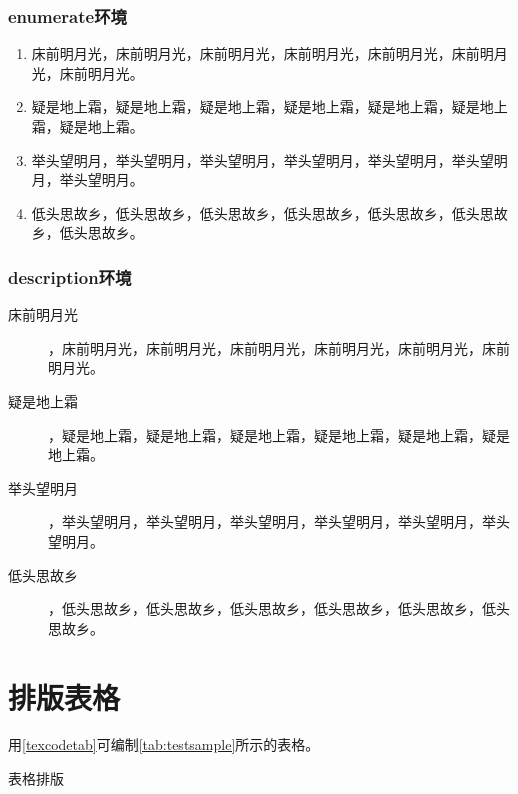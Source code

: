 \documentclass{nwafucoursepaper}
\begin{document}
\subsubsection{enumerate环境}
\begin{enumerate}
\item 床前明月光，床前明月光，床前明月光，床前明月光，床前明月光，床前明月光，床前明月光。
\item 疑是地上霜，疑是地上霜，疑是地上霜，疑是地上霜，疑是地上霜，疑是地上霜，疑是地上霜。
\item 举头望明月，举头望明月，举头望明月，举头望明月，举头望明月，举头望明月，举头望明月。
\item 低头思故乡，低头思故乡，低头思故乡，低头思故乡，低头思故乡，低头思故乡，低头思故乡。
\end{enumerate}
\subsubsection{description环境}
\begin{description}
\item[床前明月光]，床前明月光，床前明月光，床前明月光，床前明月光，床前明月光，床前明月光。
\item[疑是地上霜]，疑是地上霜，疑是地上霜，疑是地上霜，疑是地上霜，疑是地上霜，疑是地上霜。
\item[举头望明月]，举头望明月，举头望明月，举头望明月，举头望明月，举头望明月，举头望明月。
\item[低头思故乡]，低头思故乡，低头思故乡，低头思故乡，低头思故乡，低头思故乡，低头思故乡。
\end{description}
\section{排版表格}

用\cref{texcodetab}可编制\autoref{tab:testsample}所示的表格。

\begin{center}
  \begin{langCVOne}[tex][texcodetab][\LaTeX{}]{表格排版}
    \begin{table}[!htp]
    \end{table}
  \end{langCVOne}
\end{center}
\end{document}
